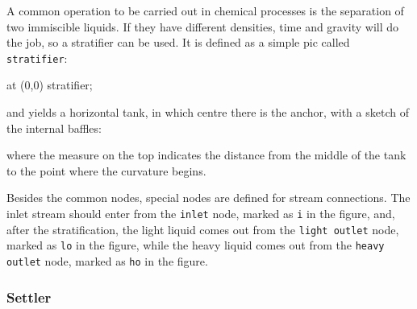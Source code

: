 \documentclass[12pt]{article}						%
\newcommand*{\chpn}[1]{\texttt{#1}}				%
\newcommand*{\chpp}[1]{\texttt{#1}}				%
\begin{document}
A common operation to be carried out in chemical processes is the separation of
two immiscible liquids. If they have different densities, time and gravity will
do the job, so a stratifier can be used. It is defined as a simple pic called
\chpp{stratifier}:
\begin{chpcode}
	\pic at (0,0) {stratifier};
\end{chpcode}
and yields a horizontal tank, in which centre there is the anchor, with a sketch
of the internal baffles:
\begin{center}
\end{center}
where the measure on the top indicates the distance from the middle of the tank
to the point where the curvature begins.

Besides the common nodes, special nodes are defined for stream connections. The
inlet stream should enter from the \chpn{inlet} node, marked as \chpn{i} in the
figure, and, after the stratification, the light liquid comes out from the
\chpn{light outlet} node, marked as \chpn{lo} in the figure, while the heavy
liquid comes out from the \chpn{heavy outlet} node, marked as \chpn{ho} in the
figure.

\subsubsection{Settler}
\end{document}
